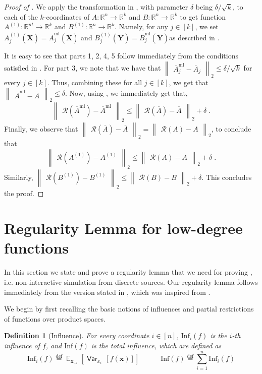 \documentclass[11pt]{article}
\newcommand{\insquare}[1]{\left [ #1 \right ]}
\newcommand{\norm}[2]{\begin{Vmatrix} #2 \end{Vmatrix}_{#1}}
\newcommand{\defeq}{\stackrel{\mathrm{def}}{=}}
\DeclareMathOperator*{\Ex}{\mathbb{E}}
\DeclareMathOperator*{\Var}{\mathsf{Var}}
\newcommand{\bbR}{{\mathbb R}}
\newcommand{\bx}{{\bm x}}
\newcommand{\bX}{\mathbf{X}}
\newcommand{\bY}{\mathbf{Y}}
\newcommand{\calR}{\mathcal{R}}
\newcommand{\Inf}{\mathrm{Inf}}
\newtheorem{definition}[theorem]{Definition}
\newcommand{\ml}{\mathrm{ml}}
\begin{document}
\begin{proof}[Proof of ]
	We apply the transformation in , with parameter $\delta$ being $\delta/\sqrt{k}$, to each of the $k$-coordinates of $A : \bbR^n \to \bbR^k$ and $B : \bbR^n \to \bbR^k$ to get function $A^{(1)} : \bbR^{nt} \to \bbR^k$ and $B^{(1)} : \bbR^n \to \bbR^k$. Namely, for any $j \in [k]$, we set $A^{(1)}_j(\overline{\bX}) = \overline{A}^{\ml}_j(\overline{\bX})$ and $B^{(1)}_j(\overline{\bY}) = \overline{B}^{\ml}_j(\overline{\bY})$as described in .
	
	It is easy to see that parts 1, 2, 4, 5 follow immediately from the conditions satisfied in . For part 3, we note that we have that $\norm{2}{\overline{A}^{\ml}_j - \overline{A}_j} \le \delta/\sqrt{k}$ for every $j \in [k]$. Thus, combining these for all $j \in [k]$, we get that $\norm{2}{\overline{A}^{\ml} - \overline{A}} \le \delta$. Now, using , we immediately get that,
	\[\norm{2}{\calR(\overline{A}^{\ml}) - \overline{A}^{\ml}} \le \norm{2}{\calR(\overline{A}) - \overline{A}} + \delta\;.\]
	Finally, we observe that $\norm{2}{\calR(\overline{A}) - \overline{A}} = \norm{2}{\calR(A) - A}$, to conclude that 
	\[\norm{2}{\calR(A^{(1)}) - A^{(1)}} \le \norm{2}{\calR(A) - A} + \delta\;.\]
	Similarly, $\norm{2}{\calR(B^{(1)}) - B^{(1)}} \le \norm{2}{\calR(B) - B} + \delta$. This concludes the proof.
	
\end{proof}%

\section{Regularity Lemma for low-degree functions} \label{sec:regularity}
In this section we state and prove a regularity lemma that we need for proving , i.e. non-interactive simulation from discrete sources. Our regularity lemma follows immediately from the version stated in \cite{GKS_NIS_decidable}, which was inspired from \cite{diakonikolas2010regularity}.

We begin by first recalling the basic notions of influences and partial restrictions of functions over product spaces. %

\begin{definition}[Influence]
	For every coordinate $i \in [n]$, $\Inf_i(f)$ is the $i$-th influence of $f$, and $\Inf(f)$ is the total influence, which are defined as
	$$\Inf_i(f) \defeq \Ex_{\bx_{-i}} \insquare{\Var_{x_i} \, [f(\bx)]} \quad \quad \quad \Inf(f) \defeq \sum\limits_{i=1}^n \Inf_i(f)$$
\end{definition}
\end{document}
